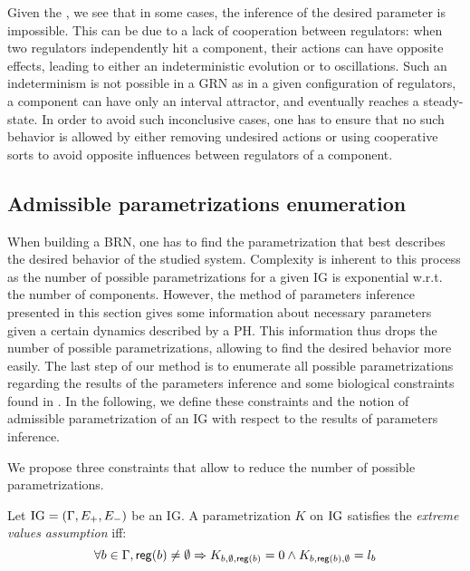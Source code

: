 
Given the , we see that in some cases, the inference of the desired parameter is impossible. This can be due to a lack of cooperation between regulators: when two regulators independently hit a component, their actions can have opposite effects, leading to either an indeterministic evolution or to oscillations. Such an indeterminism is not possible in a GRN as in a given configuration of regulators, a component can have only an interval attractor, and eventually reaches a steady-state. In order to avoid such inconclusive cases, one has to ensure that no such behavior is allowed by either removing undesired actions or using cooperative sorts to avoid opposite influences between regulators of a component.

\subsection{Admissible parametrizations enumeration}
When building a BRN, one has to find the parametrization that best describes the desired behavior of the studied system. Complexity is inherent to this process as the number of possible parametrizations for a given IG is exponential w.r.t. the number of components. However, the method of parameters inference presented in this section gives some information about necessary parameters given a certain dynamics described by a PH. This information thus drops the number of possible parametrizations, allowing to find the desired behavior more easily. The last step of our method is to enumerate all possible parametrizations regarding the results of the parameters inference and some biological constraints found in \cite{BernotSemBRN}. In the following, we define these constraints and the notion of admissible parametrization of an IG with respect to the results of parameters inference.

We propose three constraints that allow to reduce the number of possible parametrizations.

\begin{property}
Let $\mathrm{IG} = (\Gamma, E_+, E_-)$ be an IG. A parametrization $K$ on $\mathrm{IG}$ satisfies the \emph{extreme values assumption} iff:
\label{prop:param_enum_extreme}
\[
  \forall b \in \Gamma, \mathsf{reg}({b}) \neq \emptyset \Rightarrow K_{b,\emptyset,\mathsf{reg}({b})} = 0 \wedge K_{b,\mathsf{reg}({b}),\emptyset} = l_b
\]
\end{property}

